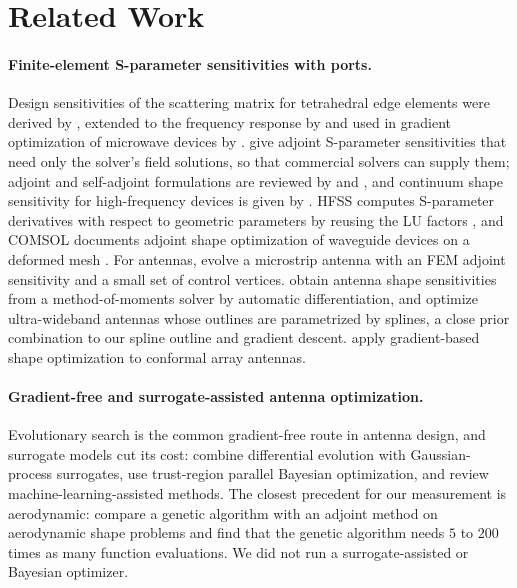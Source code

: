 \documentclass{anvil-paper}
\begin{document}
\section{Related Work}
\label{sec:related}

\paragraph{Finite-element S-parameter sensitivities with ports.}
Design sensitivities of the scattering matrix for tetrahedral edge elements
were derived by \citet{webb2000design}, extended to the frequency response
by \citet{webb2002design} and used in gradient optimization of microwave
devices by \citet{nair2003optimization}. \citet{georgieva2002feasible} give
adjoint S-parameter sensitivities that need only the solver's field
solutions, so that commercial solvers can supply them; adjoint and
self-adjoint formulations are reviewed by \citet{nikolova2004adjoint} and
\citet{nikolova2006network}, and continuum shape sensitivity for
high-frequency devices is given by \citet{choi2011generalized}. HFSS computes
S-parameter derivatives with respect to geometric parameters by reusing the
LU factors \citep{ansys_hfss_derivatives,vardapetyan2008sensitivity}, and
COMSOL documents adjoint shape optimization of waveguide devices on a
deformed mesh \citep{comsol_sensitivity_method,jensen2022comsolshape}. For
antennas, \citet{ghassemi2013antenna} evolve a microstrip antenna with an FEM
adjoint sensitivity and a small set of control vertices.
\citet{toivanen2009electromagnetic} obtain antenna shape sensitivities from a
method-of-moments solver by automatic differentiation, and
\citet{toivanen2010gradient} optimize ultra-wideband antennas whose outlines
are parametrized by splines, a close prior combination to our spline
outline and gradient descent. \citet{jacobsson2010gradient} apply
gradient-based shape optimization to conformal array antennas.

\paragraph{Gradient-free and surrogate-assisted antenna optimization.}
Evolutionary search is the common gradient-free route in antenna design, and
surrogate models cut its cost: \citet{liu2014efficient} combine differential
evolution with Gaussian-process surrogates, \citet{zhou2021trust} use
trust-region parallel Bayesian optimization, and \citet{akinsolu2020machine}
review machine-learning-assisted methods. The closest precedent for our
measurement is aerodynamic: \citet{zingg2008comparative} compare a genetic
algorithm with an adjoint method on aerodynamic shape problems and find that the
genetic algorithm needs $5$ to $200$ times as many function evaluations. We
did not run a surrogate-assisted or Bayesian optimizer.
\end{document}
